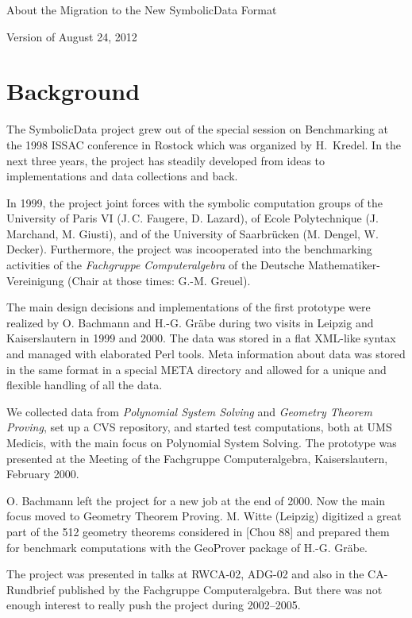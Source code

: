 \documentclass[11pt,a4paper]{article}
\begin{document}
\begin{center}
  \Large About the Migration to the New SymbolicData Format

  \normalsize Version of August 24, 2012
\end{center}

\section{Background}

The SymbolicData project grew out of the special session on Benchmarking at
the 1998 ISSAC conference in Rostock which was organized by H.~Kredel. In the
next three years, the project has steadily developed from ideas to
implementations and data collections and back.

In 1999, the project joint forces with the symbolic computation groups of the
University of Paris VI (J.\,C. Faugere, D. Lazard), of Ecole Polytechnique
(J. Marchand, M. Giusti), and of the University of Saarbrücken (M. Dengel,
W. Decker). Furthermore, the project was incooperated into the benchmarking
activities of the \emph{Fachgruppe Computeralgebra} of the Deutsche
Mathematiker-Vereinigung (Chair at those times: G.-M. Greuel).

The main design decisions and implementations of the first prototype were
realized by O. Bachmann and H.-G. Gräbe during two visits in Leipzig and
Kaiserslautern in 1999 and 2000. The data was stored in a flat XML-like syntax
and managed with elaborated Perl tools. Meta information about data was stored
in the same format in a special META directory and allowed for a unique and
flexible handling of all the data.

We collected data from \emph{Polynomial System Solving} and \emph{Geometry
  Theorem Proving}, set up a CVS repository, and started test computations,
both at UMS Medicis, with the main focus on Polynomial System Solving. The
prototype was presented at the Meeting of the Fachgruppe Computeralgebra,
Kaiserslautern, February 2000.

O. Bachmann left the project for a new job at the end of 2000. Now the main
focus moved to Geometry Theorem Proving. M. Witte (Leipzig) digitized a great
part of the 512 geometry theorems considered in [Chou 88] and prepared them
for benchmark computations with the GeoProver package of H.-G. Gräbe.

The project was presented in talks at RWCA-02, ADG-02 and also in the
CA-Rundbrief published by the Fachgruppe Computeralgebra. But there was not
enough interest to really push the project during 2002--2005. 
\end{document}
